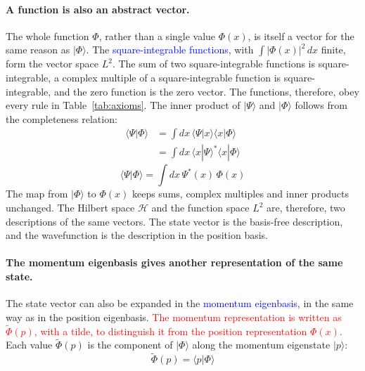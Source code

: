 \documentclass[11pt]{article}      %
\numberwithin{equation}{section}   %
\begin{document}
\paragraph{A function is also an abstract vector.} The whole function $\Phi$, rather than a single value $\Phi(x)$, is itself a vector for the same reason as $|\Phi\rangle$. The \textcolor{blue}{square-integrable functions}, with $\int |\Phi(x)|^2\, dx$ finite, form the vector space $L^2$. The sum of two square-integrable functions is square-integrable, a complex multiple of a square-integrable function is square-integrable, and the zero function is the zero vector. The functions, therefore, obey every rule in Table~\ref{tab:axioms}. The inner product of $|\Psi\rangle$ and $|\Phi\rangle$ follows from the completeness relation:
\begin{align*}
    \langle \Psi | \Phi \rangle &= \int dx\, \langle \Psi | x \rangle \langle x | \Phi \rangle \\
    &= \int dx\, \langle x | \Psi \rangle^* \langle x | \Phi \rangle
\end{align*}
\begin{equation}
    \boxed{\langle \Psi | \Phi \rangle = \int dx\, \Psi^*(x)\, \Phi(x)}
\end{equation}
The map from $|\Phi\rangle$ to $\Phi(x)$ keeps sums, complex multiples and inner products unchanged. The Hilbert space $\mathcal{H}$ and the function space $L^2$ are, therefore, two descriptions of the same vectors. The state vector is the basis-free description, and the wavefunction is the description in the position basis.

\paragraph{The momentum eigenbasis gives another representation of the same state.} The state vector can also be expanded in the \textcolor{blue}{momentum eigenbasis}, in the same way as in the position eigenbasis. \textcolor{red}{The momentum representation is written as $\tilde{\Phi}(p)$, with a tilde, to distinguish it from the position representation $\Phi(x)$.} Each value $\tilde{\Phi}(p)$ is the component of $|\Phi\rangle$ along the momentum eigenstate $|p\rangle$:
\begin{equation}
    \boxed{\tilde{\Phi}(p) = \langle p | \Phi \rangle}
\end{equation}
\end{document}
